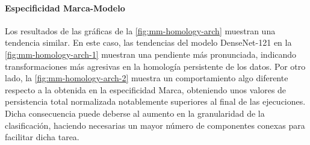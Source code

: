 \paragraph{Especificidad Marca-Modelo}

Los resultados de las gráficas de la \autoref{fig:mm-homology-arch} muestran una tendencia similar. En este caso, las tendencias del modelo DenseNet-121 en la \autoref{fig:mm-homology-arch-1} muestran una pendiente más pronunciada, indicando transformaciones más agresivas en la homología persistente de los datos. Por otro lado, la \autoref{fig:mm-homology-arch-2} muestra un comportamiento algo diferente respecto a la obtenida en la especificidad Marca, obteniendo unos valores de persistencia total normalizada notablemente superiores al final de las ejecuciones. Dicha consecuencia puede deberse al aumento en la granularidad de la clasificación, haciendo necesarias un mayor número de componentes conexas para facilitar dicha tarea.

